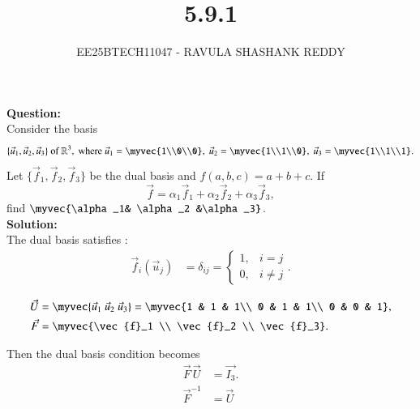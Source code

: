 \documentclass[journal]{article}
\begin{document}
	
	
	\vspace{3cm}
	
\title{5.9.1}
\author{EE25BTECH11047 - RAVULA SHASHANK REDDY}
\maketitle
\hrulefill
\bigskip 

\renewcommand{\thetable}{\theenumi}
\setlength{\intextsep}{10pt}

\textbf{Question:} \\

 Consider the basis 
\[
\{\vec{u}_1, \vec{u}_2, \vec{u}_3\} \text{ of } \mathbb{R}^3, \text{ where }
\vec{u}_1 = \myvec{1\\0\\0}, \ 
\vec{u}_2 = \myvec{1\\1\\0}, \
\vec{u}_3 = \myvec{1\\1\\1}.
\]
Let $\{\vec{f}_1, \vec{f}_2, \vec{f}_3\}$ be the dual basis and 
$f(a,b,c) = a+b+c$. If 
\[
\vec{f}= \alpha_1 \vec{f}_1 + \alpha_2 \vec{f}_2 + \alpha_3 \vec{f}_3,
\] 
find $\myvec{\alpha_1& \alpha_2 &\alpha_3}$.\\

\textbf{Solution:}\\

The dual basis satisfies :
\begin{align}
\vec{f}_i(\vec{u}_j) &= \delta_{ij} = 
\begin{cases} 
1, & i=j \\ 
0, & i\neq j 
\end{cases}. \label{eq:delta}
\end{align}

\begin{align}
\vec{U} &= \myvec{\vec{u}_1 \ \vec{u}_2 \ \vec{u}_3} 
= \myvec{1 & 1 & 1\\ 0 & 1 & 1\\ 0 & 0 & 1}, \\
\vec{F} &= \myvec{\vec{f}_1 \\ \vec{f}_2 \\ \vec{f}_3}.
\end{align}

Then the dual basis condition becomes
\begin{align}
\vec{F} \, \vec{U} &= \vec{I_3}. \label{eq:F_U}\\
\vec{F}^{-1} &= \vec{U} 
\end{align}
\end{document}
